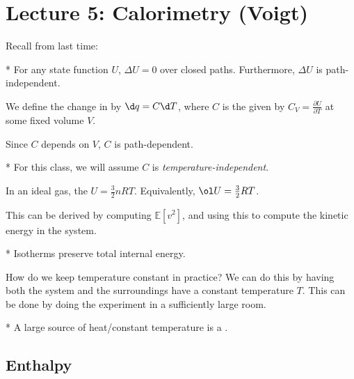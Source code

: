 \section*{Lecture 5: Calorimetry (Voigt)}
\setcounter{section}{5}
\setcounter{subsection}{0}
\setcounter{defn}{0}
\setcounter{defncontainer}{0}

Recall from last time:

\begin{fact}*
	For any state function $U$, $\Delta U = 0$ over closed paths. 
	Furthermore, $\Delta U$ is path-independent.
\end{fact}

\begin{defn}
	We define the change in  by $\d q = C\d T$, where $C$ is the  given by $C_V = \frac{\partial U}{\partial T}$ at some fixed volume $V$.
\end{defn}

\begin{fact}
	Since $C$ depends on $V$, $C$ is path-dependent.
\end{fact}

\begin{fact}*
	For this class, we will assume $C$ is \emph{temperature-independent}.
\end{fact}

\begin{thm}
	In an ideal gas, the  $U = \frac 32 nRT$. Equivalently, $\ol U = \frac 32 RT$.
\end{thm}

This can be derived by computing $\mathbb E[v^2]$, and using this to compute the kinetic energy in the system.

\begin{cor}*
	Isotherms preserve total internal energy.
\end{cor}

How do we keep temperature constant in practice? We can do this by having both the system and the surroundings have a constant temperature $T$. This can be done by doing the experiment in a sufficiently large room.

\begin{defn}*
	A large source of heat/constant temperature is a .
\end{defn}

\subsection{Enthalpy}

